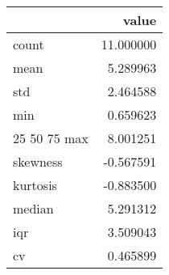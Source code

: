\begin{tabular}{lr}
\toprule
 & value \\
\midrule
count & 11.000000 \\
mean & 5.289963 \\
std & 2.464588 \\
min & 0.659623 \\
25%
50%
75%
max & 8.001251 \\
skewness & -0.567591 \\
kurtosis & -0.883500 \\
median & 5.291312 \\
iqr & 3.509043 \\
cv & 0.465899 \\
\bottomrule
\end{tabular}
